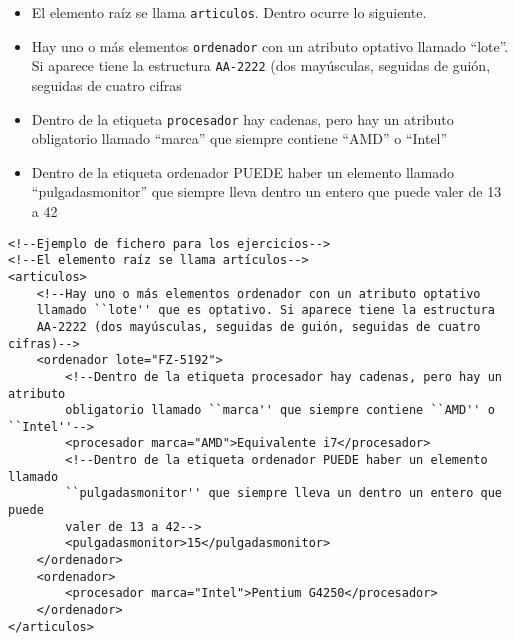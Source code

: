 \documentclass{examen}
\begin{document}

\begin{itemize}

\item{El elemento raíz se llama {\tt articulos}. Dentro ocurre lo siguiente.}
\item{Hay uno o más elementos {\tt ordenador} con un atributo optativo
    llamado ``lote''. Si aparece tiene la estructura
    {\tt AA-2222} (dos mayúsculas, seguidas de guión, seguidas de cuatro cifras}
\item{Dentro de la etiqueta {\tt procesador} hay cadenas, pero hay un atributo
        obligatorio llamado ``marca'' que siempre contiene ``AMD'' o ``Intel''}
\item{Dentro de la etiqueta ordenador PUEDE haber un elemento llamado
        ``pulgadasmonitor'' que siempre lleva  dentro un entero que puede
        valer de 13 a 42}        
\end{itemize}

\break


\begin{verbatim}
<!--Ejemplo de fichero para los ejercicios-->
<!--El elemento raíz se llama artículos-->
<articulos>
    <!--Hay uno o más elementos ordenador con un atributo optativo
    llamado ``lote'' que es optativo. Si aparece tiene la estructura
    AA-2222 (dos mayúsculas, seguidas de guión, seguidas de cuatro cifras)-->
    <ordenador lote="FZ-5192">
        <!--Dentro de la etiqueta procesador hay cadenas, pero hay un atributo
        obligatorio llamado ``marca'' que siempre contiene ``AMD'' o ``Intel''-->
        <procesador marca="AMD">Equivalente i7</procesador>
        <!--Dentro de la etiqueta ordenador PUEDE haber un elemento llamado
        ``pulgadasmonitor'' que siempre lleva un dentro un entero que puede
        valer de 13 a 42-->
        <pulgadasmonitor>15</pulgadasmonitor>
    </ordenador>
    <ordenador>
        <procesador marca="Intel">Pentium G4250</procesador>
    </ordenador>
</articulos>
\end{verbatim}
\end{document}
